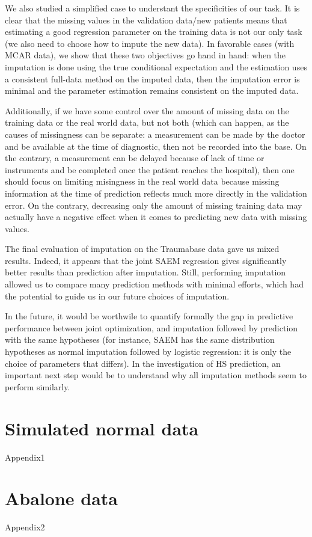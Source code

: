 \documentclass[12pt, a4paper]{memoir}
\begin{document}
We also studied a simplified case to understant the specificities of our task. It is clear that the missing values in the validation data/new patients means that estimating a good regression parameter on the training data is not our only task (we also need to choose how to impute the new data). In favorable cases (with MCAR data), we show that these two objectives go hand in hand: when the imputation is done using the true conditional expectation and the estimation uses a consistent full-data method on the imputed data, then the imputation error is minimal and the parameter estimation remains consistent on the imputed data. 

Additionally, if we have some control over the amount of missing data on the training data or the real world data, but not both (which can happen, as the causes of missingness can be separate: a measurement can be made by the doctor and be available at the time of diagnostic, then not be recorded into the base. On the contrary, a measurement can be delayed because of lack of time or instruments and be completed once the patient reaches the hospital), then one should focus on limiting misingness in the real world data because missing information at the time of prediction reflects much more directly in the validation error. On the contrary, decreasing only the amount of missing training data may actually have a negative effect when it comes to predicting new data with missing values.

The final evaluation of imputation on the Traumabase data gave us mixed results. Indeed, it appears that the joint SAEM regression gives significantly better results than prediction after imputation. Still, performing imputation allowed us to compare many prediction methods with minimal efforts, which had the potential to guide us in our future choices of imputation.

In the future, it would be worthwile to quantify formally the gap in predictive performance between joint optimization, and imputation followed by prediction with the same hypotheses (for instance, SAEM has the same distribution hypotheses as normal imputation followed by logistic regression: it is only the choice of parameters that differs). In the investigation of HS prediction, an important next step would be to understand why all imputation methods seem to perform similarly.
\begin{appendices}
\chapter{Simulated normal data}
\label{simulation}
{Appendix1}

\chapter{Abalone data}
\label{abalone}
{Appendix2}
\end{appendices}


\end{document}
